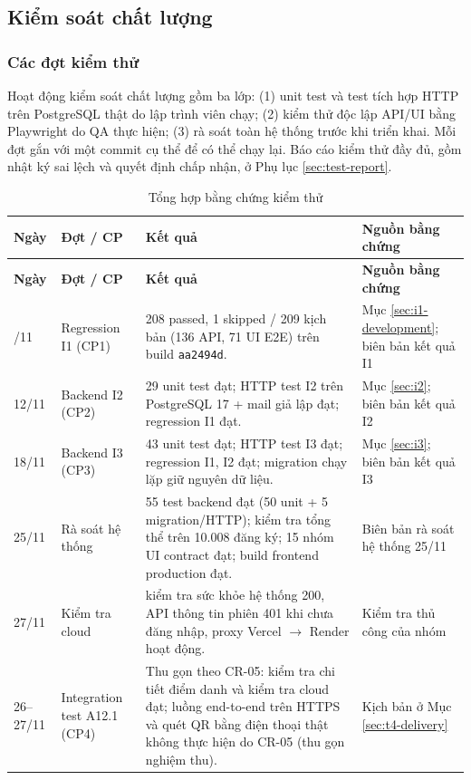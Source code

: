 \subsection{Kiểm soát chất lượng}
\label{sec:t3-quality}

\subsubsection{Các đợt kiểm thử}

Hoạt động kiểm soát chất lượng gồm ba lớp: (1) unit test và test tích hợp HTTP trên PostgreSQL thật do lập trình viên chạy; (2) kiểm thử độc lập API/UI bằng Playwright do QA thực hiện; (3) rà soát toàn hệ thống trước khi triển khai. Mỗi đợt gắn với một commit cụ thể để có thể chạy lại. Báo cáo kiểm thử đầy đủ, gồm nhật ký sai lệch và quyết định chấp nhận, ở Phụ lục \ref{sec:test-report}.

\begingroup\footnotesize
\renewcommand{\arraystretch}{1.15}
\begin{longtable}{@{}p{.10\linewidth}p{.13\linewidth}p{.40\linewidth}p{.30\linewidth}@{}}
\caption{Tổng hợp bằng chứng kiểm thử}\label{tab:t3-test-runs}\\
\toprule
\textbf{Ngày} & \textbf{Đợt / CP} & \textbf{Kết quả} & \textbf{Nguồn bằng chứng}\\\midrule\endfirsthead
\toprule
\textbf{Ngày} & \textbf{Đợt / CP} & \textbf{Kết quả} & \textbf{Nguồn bằng chứng}\\\midrule\endhead
\bottomrule\endfoot
07/11 & Regression I1 (CP1) & 208 passed, 1 skipped / 209 kịch bản (136 API, 71 UI E2E) trên build \texttt{aa2494d}. & Mục \ref{sec:i1-development}; biên bản kết quả I1\\
12/11 & Backend I2 (CP2) & 29 unit test đạt; HTTP test I2 trên PostgreSQL 17 + mail giả lập đạt; regression I1 đạt. & Mục \ref{sec:i2}; biên bản kết quả I2\\
18/11 & Backend I3 (CP3) & 43 unit test đạt; HTTP test I3 đạt; regression I1, I2 đạt; migration chạy lặp giữ nguyên dữ liệu. & Mục \ref{sec:i3}; biên bản kết quả I3\\
25/11 & Rà soát hệ thống & 55 test backend đạt (50 unit + 5 migration/HTTP); kiểm tra tổng thể trên 10.008 đăng ký; 15 nhóm UI contract đạt; build frontend production đạt. & Biên bản rà soát hệ thống 25/11\\
27/11 & Kiểm tra cloud & kiểm tra sức khỏe hệ thống 200, API thông tin phiên 401 khi chưa đăng nhập, proxy Vercel $\to$ Render hoạt động. & Kiểm tra thủ công của nhóm\\
26--27/11 & Integration test A12.1 (CP4) & Thu gọn theo CR-05: kiểm tra chi tiết điểm danh và kiểm tra cloud đạt; luồng end-to-end trên HTTPS và quét QR bằng điện thoại thật không thực hiện do CR-05 (thu gọn nghiệm thu). & Kịch bản ở Mục \ref{sec:t4-delivery}\\
\end{longtable}
\endgroup


